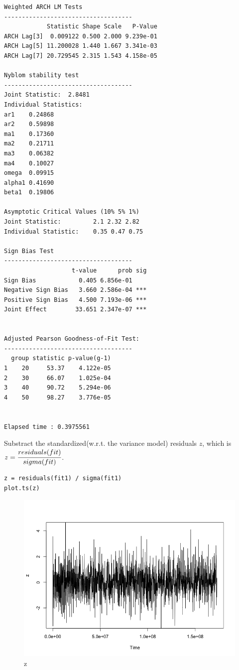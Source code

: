 \documentclass[a4paper, 11pt]{article}
\begin{document}
\begin{verbatim}
Weighted ARCH LM Tests
------------------------------------
            Statistic Shape Scale   P-Value
ARCH Lag[3]  0.009122 0.500 2.000 9.239e-01
ARCH Lag[5] 11.200028 1.440 1.667 3.341e-03
ARCH Lag[7] 20.729545 2.315 1.543 4.158e-05

Nyblom stability test
------------------------------------
Joint Statistic:  2.8481
Individual Statistics:              
ar1    0.24868
ar2    0.59898
ma1    0.17360
ma2    0.21711
ma3    0.06382
ma4    0.10027
omega  0.09915
alpha1 0.41690
beta1  0.19806

Asymptotic Critical Values (10% 5% 1%)
Joint Statistic:     	 2.1 2.32 2.82
Individual Statistic:	 0.35 0.47 0.75

Sign Bias Test
------------------------------------
                   t-value      prob sig
Sign Bias            0.405 6.856e-01    
Negative Sign Bias   3.660 2.586e-04 ***
Positive Sign Bias   4.500 7.193e-06 ***
Joint Effect        33.651 2.347e-07 ***


Adjusted Pearson Goodness-of-Fit Test:
------------------------------------
  group statistic p-value(g-1)
1    20     53.37    4.122e-05
2    30     66.07    1.025e-04
3    40     90.72    5.294e-06
4    50     98.27    3.776e-05


Elapsed time : 0.3975561
\end{verbatim}

\indent Substract the standardized(w.r.t. the variance model) residuals $z$, which is $z = \cfrac{residuals(fit)}{sigma(fit)}$.

\begin{verbatim}
z = residuals(fit1) / sigma(fit1)
plot.ts(z)
\end{verbatim}

\begin{figure}[H]
\centering
\caption{z}
\includegraphics[scale=.40]{z.png}
\end{figure}
\end{document}
